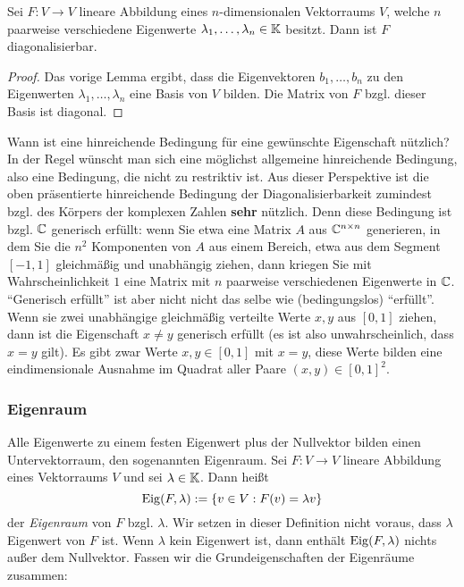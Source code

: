 \begin{thm} 
	Sei $ F : V \to V$ lineare Abbildung eines $n$-dimensionalen Vektorraums $V$, welche $n$ paarweise verschiedene Eigenwerte $ \lambda_1, \ldots, \lambda_n \in \mathbb K$ besitzt. Dann ist $ F $ diagonalisierbar.
\end{thm}
\begin{proof}
	Das vorige Lemma ergibt, dass die Eigenvektoren $b_1,\ldots,b_n$ zu den Eigenwerten $\lambda_1,\ldots,\lambda_n$ eine Basis von $V$ bilden. Die Matrix von $F$ bzgl. dieser Basis ist diagonal. 
\end{proof}

Wann ist eine hinreichende Bedingung für eine gewünschte Eigenschaft nützlich? In der Regel wünscht man sich eine möglichst allgemeine hinreichende Bedingung, also eine Bedingung, die nicht zu restriktiv ist. Aus dieser Perspektive ist die oben präsentierte hinreichende Bedingung der Diagonalisierbarkeit zumindest bzgl. des Körpers der komplexen Zahlen \textbf{sehr} nützlich.  Denn diese Bedingung ist bzgl. $\mathbb C$ generisch erfüllt: wenn Sie etwa eine Matrix $A$ aus $\mathbb C^{n \times n}$ generieren, in dem Sie die $n^2$ Komponenten von $A$ aus einem Bereich, etwa aus dem Segment $[-1,1]$ gleichmäßig und unabhängig ziehen, dann kriegen Sie mit Wahrscheinlichkeit $1$ eine Matrix mit $n$ paarweise verschiedenen Eigenwerte in $\mathbb C$. ``Generisch erfüllt'' ist aber nicht nicht das selbe wie (bedingungslos) ``erfüllt''. Wenn sie zwei unabhängige gleichmäßig verteilte Werte $x,y$ aus $[0,1]$ ziehen, dann ist die Eigenschaft $x \ne y$ generisch erfüllt (es ist also unwahrscheinlich, dass $x=y$ gilt). Es gibt zwar Werte $x,y \in [0,1]$ mit $x =y$, diese Werte bilden eine eindimensionale Ausnahme im Quadrat aller Paare $(x,y) \in [0,1]^2$. 


\subsubsection{Eigenraum}

Alle Eigenwerte zu einem festen Eigenwert plus der Nullvektor bilden einen Untervektorraum, den sogenannten Eigenraum. Sei $F: V \to V$ lineare Abbildung eines Vektorraums $V$ und sei $\lambda \in \mathbb K$. Dann heißt
\begin{equation}
	\operatorname{Eig}(F,\lambda) := \{ v \in V : F(v) = \lambda v \}
\end{equation}
der \emph{Eigenraum} von $ F $ bzgl. $ \lambda $. Wir setzen in dieser Definition nicht voraus, dass $\lambda$ Eigenwert von $F$ ist. Wenn $\lambda$ kein Eigenwert ist, dann enthält $\operatorname{Eig}(F,\lambda)$ nichts außer dem Nullvektor. Fassen wir die Grundeigenschaften der Eigenräume zusammen: 

